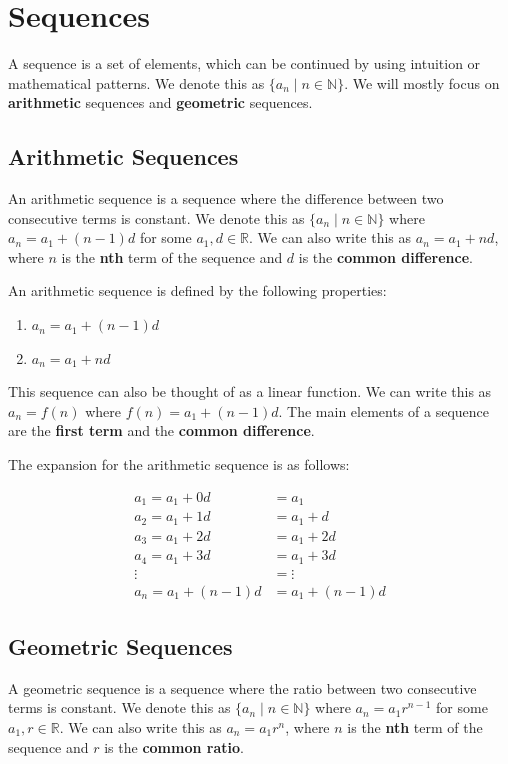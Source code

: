 \documentclass[11pt]{article}
\begin{document}
\section{Sequences}
\label{sec:org4e5fc99}

A sequence is a set of elements, which can be continued by using intuition or mathematical patterns. We denote this as \(\{a_n \mid n \in \mathbb{N}\}\). We will mostly focus on \textbf{arithmetic} sequences and \textbf{geometric} sequences.

\subsection{Arithmetic Sequences}
\label{sec:orga5ad7d6}
An arithmetic sequence is a sequence where the difference between two consecutive terms is constant. We denote this as \(\{a_n \mid n \in \mathbb{N}\}\) where \(a_n = a_1 + (n-1)d\) for some \(a_1, d \in \mathbb{R}\). We can also write this as \(a_n = a_1 + nd\), where \(n\) is the \textbf{nth} term of the sequence and \(d\) is the \textbf{common difference}.

An arithmetic sequence is defined by the following properties:
\begin{enumerate}
\item \(a_n = a_1 + (n-1)d\)
\item \(a_n = a_1 + nd\)
\end{enumerate}

This sequence can also be thought of as a linear function. We can write this as \(a_n = f(n)\) where \(f(n) = a_1 + (n-1)d\). The main elements of a sequence are the \textbf{first term} and the \textbf{common difference}.

The expansion for the arithmetic sequence is as follows:

\begin{align}
a_1 = a_1 + 0d &= a_1 \\
a_2 = a_1 + 1d &= a_1 + d \\
a_3 = a_1 + 2d &= a_1 + 2d \\
a_4 = a_1 + 3d &= a_1 + 3d \\
\vdots &= \vdots \\
a_n = a_1 + (n-1)d &= a_1 + (n-1)d
\end{align}

\subsection{Geometric Sequences}
\label{sec:org1a4deb2}
A geometric sequence is a sequence where the ratio between two consecutive terms is constant. We denote this as \(\{a_n \mid n \in \mathbb{N}\}\) where \(a_n = a_1 r^{n-1}\) for some \(a_1, r \in \mathbb{R}\). We can also write this as \(a_n = a_1 r^n\), where \(n\) is the \textbf{nth} term of the sequence and \(r\) is the \textbf{common ratio}.
\end{document}
